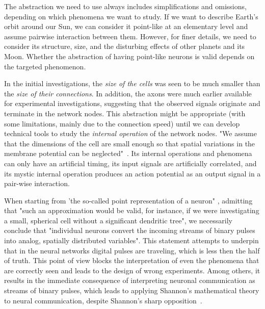 The abstraction we need to use always includes simplifications and omissions,
depending on which phenomena we want to study. If we want to describe Earth's orbit around our Sun, we can consider it point-like at an elementary level and assume pairwise interaction between them.  However, for finer details, we need to consider its structure, size, and the disturbing effects of other planets and its Moon. Whether the abstraction of having point-like neurons is valid depends on the targeted phenomenon.

In the initial investigations, the \textit{size of the cells} was seen
to be much smaller than the \textit{size of their connections}.
In addition, the axons were much earlier available for experimental
investigations, suggesting that the observed signals originate and
terminate in the network nodes. This abstraction might be
appropriate (with some limitations, mainly due to the connection speed)
until we can develop technical tools to study the \textit{internal operation}
of the network nodes. "We assume that the dimensions
of the cell are small enough so that spatial variations in the membrane potential can be neglected"~\cite{KochBiophysics:1999}. Its internal operations and phenomena can only have an artificial timing, its input signals are artificially correlated, and its mystic internal operation produces an action potential as an output signal in a pair-wise interaction.

When starting from 'the so-called point representation
of a neuron" \cite{KochBiophysics:1999}, admitting that "such
an approximation would be valid, for instance, if we were investigating
a small, spherical cell without a significant dendritic tree", we
necessarily conclude that "individual neurons convert
the incoming streams of binary pulses into analog, spatially distributed
variables". This statement attempts to underpin that in the neural networks
digital pulses are traveling, which is less then the half of truth.
This point of view blocks the interpretation of even the phenomena that are correctly seen and leads to the design of wrong experiments. Among others, it results in the immediate consequence of interpreting neuronal communication as streams of binary pulses,
which leads to applying Shannon’s mathematical theory to neural communication, despite Shannon's sharp opposition~\cite{ShannonBandwagon:1956}.




